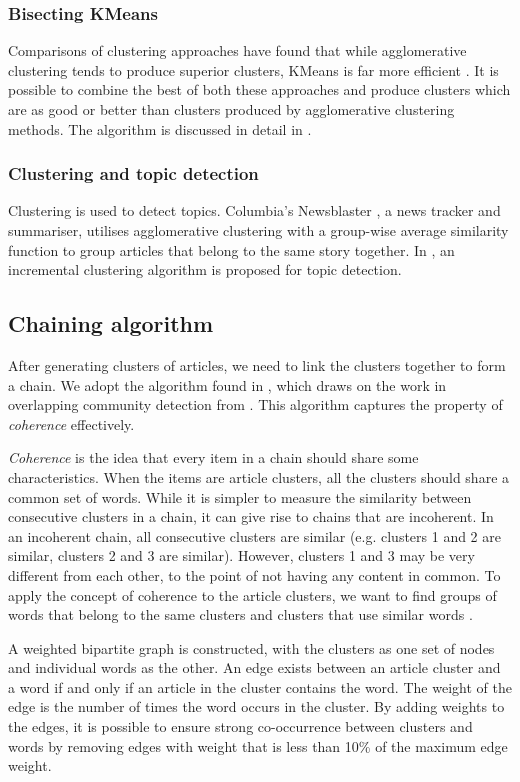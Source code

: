 \documentclass[12pt]{article}
\begin{document}
\subsubsection{Bisecting KMeans} \label{bkmeans}
Comparisons of clustering approaches have found that while agglomerative clustering tends to produce superior clusters, KMeans is far more efficient \cite{ctechniquecomp}. It is possible to combine the best of both these approaches and produce clusters which are as good or better than clusters produced by agglomerative clustering methods. The algorithm is discussed in detail in \cite{ctechniquecomp}.

\subsubsection{Clustering and topic detection}
Clustering is used to detect topics. Columbia's Newsblaster \cite{newsblaster}, a news tracker and summariser, utilises agglomerative clustering with a group-wise average similarity function to group articles that belong to the same story together. In \cite{tdttanalysis}, an incremental clustering algorithm is proposed for topic detection.


\subsection{Chaining algorithm} \label{chainalgo}
After generating clusters of articles, we need to link the clusters together to form a chain. We adopt the algorithm found in \cite{infocartography}, which draws on the work in overlapping community detection from \cite{overlapcom}. This algorithm captures the property of \textit{coherence} effectively.

\textit{Coherence} is the idea that every item in a chain should share some characteristics. When the items are article clusters, all the clusters should share a common set of words. While it is simpler to measure the similarity between consecutive clusters in a chain, it can give rise to chains that are incoherent. In an incoherent chain, all consecutive clusters are similar (e.g. clusters 1 and 2 are similar, clusters 2 and 3 are similar). However, clusters 1 and 3 may be very different from each other, to the point of not having any content in common. To apply the concept of coherence to the article clusters, we want to find groups of words that belong to the same clusters and clusters that use similar words \cite{infocartography}.

A weighted bipartite graph is constructed, with the clusters as one set of nodes and individual words as the other. An edge exists between an article cluster and a word if and only if an article in the cluster contains the word. The weight of the edge is the number of times the word occurs in the cluster. By adding weights to the edges, it is possible to ensure strong co-occurrence between clusters and words by removing edges with weight that is less than 10\% of the maximum edge weight.
	
\end{document}
